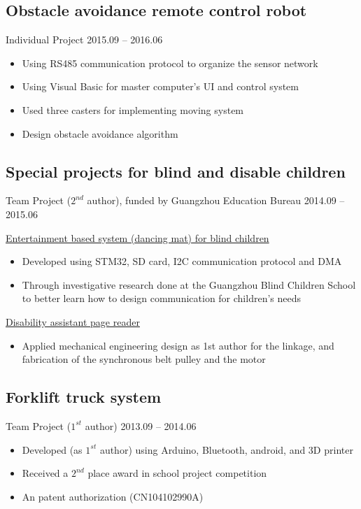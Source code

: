 \documentclass[11pt,a4paper,sans]{moderncv}
\begin{document}
\subsection{Obstacle avoidance remote control robot}
Individual Project \hfill 2015.09 -- 2016.06
\vspace{2pt}
\begin{itemize}
\item Using RS485 communication protocol to organize the sensor network
\item Using Visual Basic for master computer's UI and control system
\item Used three casters for implementing moving system
\item Design obstacle avoidance algorithm
\end{itemize}

\subsection{Special projects for blind and disable children}
Team Project ($2^{nd}$ author), funded by Guangzhou Education Bureau \hfill 2014.09 -- 2015.06

\vspace{1em}
\underline{Entertainment based system (dancing mat) for blind children}
\vspace{2pt}
\begin{itemize}
\item Developed using STM32, SD card, I2C communication protocol and DMA
\item Through investigative research done at the Guangzhou Blind Children School to better learn how to design communication for children's needs
\end{itemize}

\vspace{6pt}

\underline{Disability assistant page reader}
\vspace{2pt}
\begin{itemize}
\item Applied mechanical engineering design as 1st author for the linkage, and fabrication of the synchronous belt pulley and the motor
\end{itemize} 

\subsection{Forklift truck system}
Team Project ($1^{st}$ author) \hfill 2013.09 -- 2014.06
\begin{itemize}
\item Developed (as $1^{st}$ author) using Arduino, Bluetooth, android, and 3D printer
\item Received a $2^{nd}$ place award in school project competition
\item An patent authorization (CN104102990A)
\end{itemize}
\end{document}
